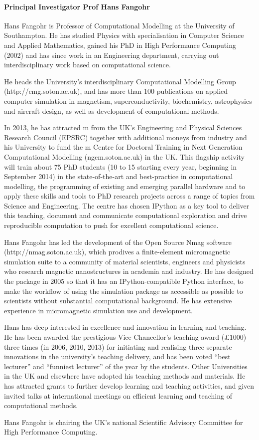 \paragraph{Principal Investigator Prof Hans Fangohr} Hans Fangohr is
Professor of Computational Modelling at the University of
Southampton. He has studied Physics with specialisation in Computer
Science and Applied Mathematics, gained his PhD in High Performance
Computing (2002) and has since work in an Engineering department, carrying
out interdisciplinary work based on computational science.

He heads the University's interdisciplinary Computational Modelling
Group (http://cmg.soton.ac.uk), and has more than 100 publications on
applied computer simulation in magnetism, superconductivity,
biochemistry, astrophysics and aircraft design, as well as development of
computational methods. 


In 2013, he has attracted m from the UK's Engineering and Physical
Sciences Research Council (EPSRC) together with additional moneys from
industry and his University to fund the m Centre for Doctoral
Training in Next Generation Computational Modelling (ngcm.soton.ac.uk)
in the UK. This flagship activity will train about 75 PhD students (10
to 15 starting every year, beginning in September 2014) in the
state-of-the-art and best-practice in computational modelling, the
programming of existing and emerging parallel hardware and to apply
these skills and tools to PhD research projects across a range of
topics from Science and Engineering. The centre has chosen IPython as
a key tool to deliver this teaching, document and communicate
computational exploration and drive reproducible computation to push
for excellent computational science.

Hans Fangohr has led the development of the Open Source Nmag software
(http://nmag.soton.ac.uk), which prodives a finite-element
micromagnetic simulation suite to a community of material scientists,
engineers and physicists who research magnetic nanostructures in
academia and industry. He has designed the package in 2005 so
that it has an IPython-compatible Python interface, to make the
workflow of using the simulation package as accessible as possible to
scientists without substantial computational background. He has
extensive experience in micromagnetic simulation use and development.

Hans has deep interested in excellence and innovation in learning and
teaching. He has been awarded the prestigious Vice Chancellor’s
teaching award ($\pounds 1000$) three times (in 2006, 2010, 2013) for
initiating and realising three separate innovations in the
university's teaching delivery, and has been voted ``best lecturer''
and ``funniest lecturer'' of the year by the students. Other
Universities in the UK and elsewhere have adopted his teaching methods
and materials. He has attracted grants to further develop learning and
teaching activities, and given invited talks at international
meetings on efficient learning and teaching of computational methods.
 
Hans Fangohr is chairing the UK's national Scientific Advisory
Committee for High Performance Computing.


